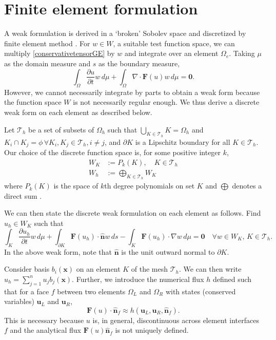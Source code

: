 \documentclass[11pt]{article}
\let\bld\boldsymbol
\begin{document}
\section{Finite element formulation}

A weak formulation is derived in a `broken' Sobolev space and discretized by finite element method \cite{luo_taylor}. For $w \in W$, a suitable test function space, we can multiply \eqref{conservativetensorGE} by $w$ and integrate over an element $\Omega_e$. Taking $\mu$ as the domain measure and $s$ as the boundary measure,
\begin{equation}
\int_{\Omega} \frac{\partial u}{\partial t}w\,d\mu + \int_{\Omega}\nabla\cdot\bld{F}(u)w \,d\mu = \bld{0}.
\end{equation}
However, we cannot necessarily integrate by parts to obtain a weak form because the function space $W$ is not necessarily regular enough. We thus derive a discrete weak form on each element as described below.

Let $\mathcal{T}_h$ be a set of subsets of $\Omega_h$ such that $\bigcup_{K\in \mathcal{T}_h}K = \Omega_h$ and $K_i \cap K_j = \phi \, \forall K_i, K_j \in \mathcal{T}_h, i \neq j$, and $\partial K$ is a Lipschitz boundary for all $K \in \mathcal{T}_h$. Our choice of the discrete function space is, for some positive integer $k$,
\begin{align}
W_{K} &:= P_k(K), \quad K \in \mathcal{T}_h \\
W_h &:= \bigoplus_{K \in \mathcal{T}_h} W_{K}
\end{align}
where $P_k(K)$ is the space of $k$th degree polynomials on set $K$ and $\bigoplus$ denotes a direct sum \cite{nodaldg}.

We can then state the discrete weak formulation on each element as follows. Find $u_h \in W_{K}$ such that
\begin{equation}
\int_{K} \frac{\partial u_h}{\partial t}w\,d\mu + \int_{\partial K} \bld{F}(u_h)\cdot\hat{\bld{n}}w \,ds - \int_{K}\bld{F}(u_h)\cdot\nabla w \,d\mu = \bld{0} \quad \forall w \in W_{K},\, K \in \mathcal{T}_h.
\label{wf}
\end{equation}
In the above weak form, note that $\hat{\bld{n}}$ is the unit outward normal to $\partial K$.

Consider basis $b_i(\bld{x})$ on an element $K$ of the mesh $\mathcal{T}_h$. We can then write $u_h = \sum_{j=1}^n u_j b_j(\bld{x})$. Further, we introduce the numerical flux $h$ defined such that for a face $f$ between two elements $\Omega_L$ and $\Omega_R$ with states (conserved variables) $\bld{u}_L$ and $ \bld{u}_R$,
\begin{equation}
\bld{F}(u)\cdot\hat{\bld{n}}_f \approx h(\bld{u}_L, \bld{u}_R, \hat{\bld{n}}_f).
\end{equation}
This is necessary because $u$ is, in general, discontinuous across element interfaces $f$ and the analytical flux $\bld{F}(u)\hat{\bld{n}}_f$ is not uniquely defined.
\end{document}
